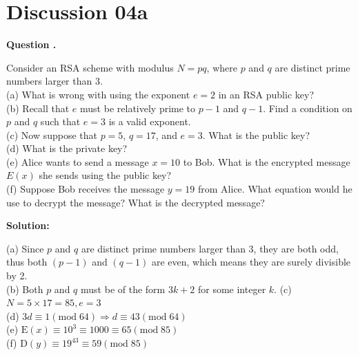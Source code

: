 \documentclass[12pt]{article}
\newcounter{questionnumber}
\newenvironment{question}[1][]{\stepcounter{questionnumber}\par\noindent\textbf{Question \thequestionnumber. #1}\par}{\par}
\newenvironment{solution}{\par\noindent\textbf{Solution:}\par}{\par\vspace{1em}}
\begin{document}
\section{Discussion 04a}
\begin{question}
    Consider an RSA scheme with modulus $N = pq$, where $p$ and $q$ are distinct prime numbers larger than 3.\\
    (a) What is wrong with using the exponent $e = 2$ in an RSA public key?\\
    (b) Recall that $e$ must be relatively prime to $p-1$ and $q-1$. Find a condition on $p$ and $q$ such that $e = 3$ is a valid exponent.\\
    (c) Now suppose that $p = 5$, $q = 17$, and $e = 3$. What is the public key?\\
    (d) What is the private key?\\
    (e) Alice wants to send a message $x = 10$ to Bob. What is the encrypted message $E(x)$ she sends using the public key?\\
    (f) Suppose Bob receives the message $y = 19$ from Alice. What equation would he use to decrypt the message? What is the decrypted message?
\end{question}
\begin{solution}
    \noindent
    (a) Since $p$ and $q$ are distinct prime numbers larger than 3, they are both odd, thus both $(p-1)$ and $(q-1)$ are even, which means they are surely divisible by 2.\\
    (b) Both $p$ and $q$ must be of the form $3k+2$ for some integer $k$.
    (c) $N=5\times 17=85, e=3$\\
    (d) $3d\equiv 1\left( \mathrm{mod}\;64 \right) \Longrightarrow d\equiv 43\left( \mathrm{mod}\;64 \right) $\\
    (e) $\mathrm{E}\left( x \right) \equiv 10^3\equiv 1000\equiv 65\left( \mathrm{mod}\;85 \right) $\\
    (f) $\mathrm{D}\left( y \right) \equiv 19^{43}\equiv 59\left( \mathrm{mod}\;85 \right) $
\end{solution}
\end{document}
